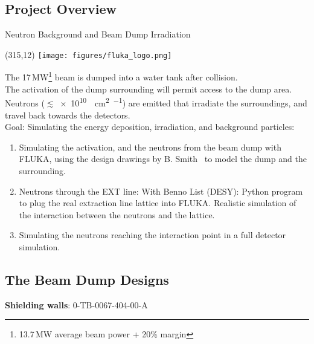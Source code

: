 \documentclass[xcolor={dvipsnames}]{beamer}
\newcommand{\flukalogo}{
  \setlength{\TPHorizModule}{1pt}
  \setlength{\TPVertModule}{1pt}
  \begin{textblock}{1}(315,12)
   \texttt{[image: figures/fluka\_logo.png]}
  \end{textblock}
}
\begin{document}
\subsection{Project Overview}
{
\begin{frame}{Neutron Background and Beam Dump Irradiation}
\flukalogo
The 17\,MW\footnote{13.7\,MW average beam power + 20\% margin} beam is dumped into a water tank after collision.\\The activation of the dump surrounding will permit access to the dump area. Neutrons ($\lesssim$\SI{e10}{\per\square\centi\metre\per\year}) are emitted that irradiate the surroundings, and travel back towards the detectors.~\cite{SLAC_FLUKA}\\
\vspace*{0.1cm}
\alert{Goal: Simulating the energy deposition, irradiation, and background particles:}
\begin{enumerate}
 \item Simulating the activation, and the neutrons from the beam dump with FLUKA, using the design drawings by B. Smith~\cite{Smith} to model the dump and the surrounding.
 \item Neutrons through the EXT line: With Benno List (DESY): Python program to plug the real extraction line lattice into FLUKA. Realistic simulation of the interaction between the neutrons and the lattice.
 \item Simulating the neutrons reaching the interaction point in a full detector simulation.
\end{enumerate}
\end{frame}
}

\subsection{The Beam Dump Designs}
\begin{frame}{\textbf{Shielding walls}: 0-TB-0067-404-00-A}
\begin{center}
\end{center}
\end{frame}
\end{document}
